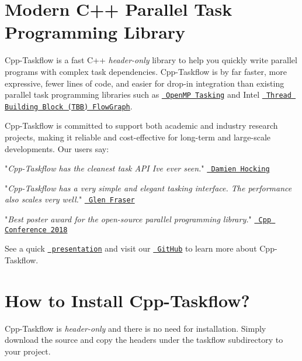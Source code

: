\hypertarget{index_ModernCppParallelTaskProgrammingLibrary}{}\section{Modern C++ Parallel Task Programming Library}\label{index_ModernCppParallelTaskProgrammingLibrary}
Cpp-\/\+Taskflow is a fast C++ {\itshape header-\/only} library to help you quickly write parallel programs with complex task dependencies. Cpp-\/\+Taskflow is by far faster, more expressive, fewer lines of code, and easier for drop-\/in integration than existing parallel task programming libraries such as \href{http://www.nersc.gov/users/software/programming-models/openmp/openmp-tasking/}{\texttt{ Open\+MP Tasking}} and Intel \href{https://www.threadingbuildingblocks.org/tutorial-intel-tbb-flow-graph}{\texttt{ Thread Building Block (T\+BB) Flow\+Graph}}.



Cpp-\/\+Taskflow is committed to support both academic and industry research projects, making it reliable and cost-\/effective for long-\/term and large-\/scale developments. Our users say\+:

\begin{DoxyItemize}
\item "{\itshape Cpp-\/\+Taskflow has the cleanest task A\+PI I\textquotesingle{}ve ever seen.}" \href{https://github.com/damienhocking}{\texttt{ Damien Hocking}} \item "{\itshape Cpp-\/\+Taskflow has a very simple and elegant tasking interface. The performance also scales very well.}" \href{https://github.com/totalgee}{\texttt{ Glen Fraser}} \item "{\itshape Best poster award for the open-\/source parallel programming library.}" \href{https://github.com/CppCon/CppCon2018}{\texttt{ Cpp Conference 2018}}\end{DoxyItemize}
See a quick \href{https://cpp-taskflow.github.io/}{\texttt{ presentation}} and visit our \href{https://github.com/cpp-taskflow/cpp-taskflow}{\texttt{ Git\+Hub}} to learn more about Cpp-\/\+Taskflow.\hypertarget{index_HowToInstallCppTaskflow}{}\section{How to Install Cpp-\/\+Taskflow?}\label{index_HowToInstallCppTaskflow}
Cpp-\/\+Taskflow is {\itshape header-\/only} and there is no need for installation. Simply download the source and copy the headers under the {\ttfamily taskflow} subdirectory to your project.



